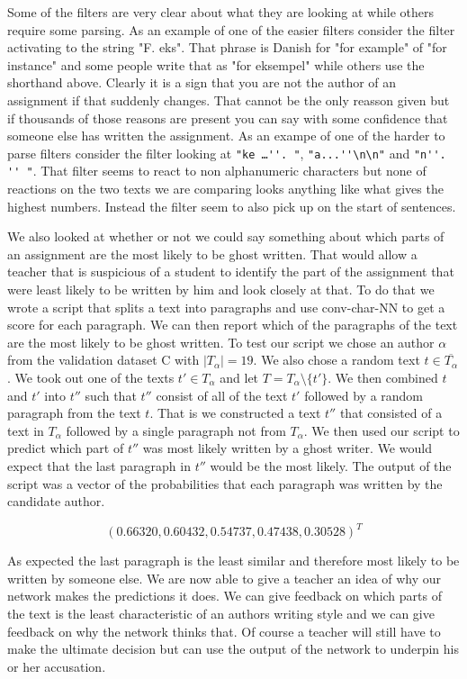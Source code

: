Some of the filters are very clear about what they are looking at while others
require some parsing. As an example of one of the easier filters consider the
filter activating to the string "F. eks". That phrase is Danish for "for
example" of "for instance" and some people write that as "for eksempel" while
others use the shorthand above. Clearly it is a sign that you are not the author
of an assignment if that suddenly changes. That cannot be the only reasson given
but if thousands of those reasons are present you can say with some confidence
that someone else has written the assignment. As an exampe of one of the harder
to parse filters consider the filter looking at \verb["ke …''. "[,
\verb["a...''\n\n"[ and \verb["n''. '' "[. That filter seems to react to non
alphanumeric characters but none of reactions on the two texts we are comparing
looks anything like what gives the highest numbers. Instead the filter seem to
also pick up on the start of sentences.

We also looked at whether or not we could say something about which parts of an
assignment are the most likely to be ghost written. That would allow a teacher
that is suspicious of a student to identify the part of the assignment that were
least likely to be written by him and look closely at that. To do that we wrote
a script that splits a text into paragraphs and use \gls{conv-char-NN} to get a
score for each paragraph. We can then report which of the paragraphs of the text
are the most likely to be ghost written. To test our script we chose an author
$\alpha$ from the validation dataset C with $|T_\alpha| = 19$. We also chose a
random text $t \in \overline{T_\alpha}$. We took out one of the texts $t' \in
T_\alpha$ and let $T = T_\alpha \setminus \{t'\}$. We then combined $t$ and $t'$
into $t''$ such that $t''$ consist of all of the text $t'$ followed by a random
paragraph from the text $t$. That is we constructed a text $t''$ that consisted
of a text in $T_\alpha$ followed by a single paragraph not from $T_\alpha$. We
then used our script to predict which part of $t''$ was most likely written by
a ghost writer. We would expect that the last paragraph in $t''$ would be the
most likely. The output of the script was a vector of the probabilities that
each paragraph was written by the candidate author.

\begin{equation}
    (0.66320, 0.60432, 0.54737, 0.47438, 0.30528)^T
\end{equation}

As expected the last paragraph is the least similar and therefore most likely to
be written by someone else. We are now able to give a teacher an idea of why our
network makes the predictions it does. We can give feedback on which parts of
the text is the least characteristic of an authors writing style and we can give
feedback on why the network thinks that. Of course a teacher will still have to
make the ultimate decision but can use the output of the network to underpin his
or her accusation.


